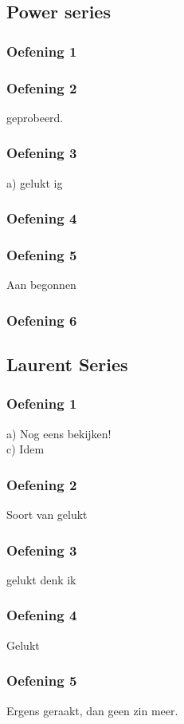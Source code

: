 \documentclass[a4paper,twoside]{article}
\theoremstyle{definition}
\theoremstyle{plain}
\begin{document}
\subsection{Power series}
\subsubsection{Oefening 1}
\subsubsection{Oefening 2}
geprobeerd.
\subsubsection{Oefening 3}
a) gelukt ig\\

\subsubsection{Oefening 4}
\subsubsection{Oefening 5}
Aan begonnen
\subsubsection{Oefening 6}
\subsection{Laurent Series}
\subsubsection{Oefening 1}
a) Nog eens bekijken!\\
c) Idem
\subsubsection{Oefening 2}
Soort van gelukt
\subsubsection{Oefening 3}
gelukt denk ik
\subsubsection{Oefening 4}
Gelukt
\subsubsection{Oefening 5}
Ergens geraakt, dan geen zin meer.
\end{document}
